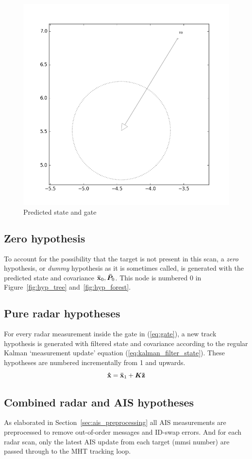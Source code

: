 \begin{figure}
\centering
\includegraphics[width = .7\textwidth]{Figures/gate_without_measurement.png}
\caption{Predicted state and gate}\label{fig:gate_illustration}
\end{figure}

\subsection{Zero hypothesis}
To account for the possibility that the target is not present in this scan, a \emph{zero} hypothesis, or \emph{dummy} hypothesis as it is sometimes called, is generated with the predicted state and covariance \(\boldsymbol{\mathbf{\bar{x}}}_0, \bm{\bar{P}}_0\). This node is numbered 0 in Figure~\ref{fig:hyp_tree} and~\ref{fig:hyp_forest}.

\subsection{Pure radar hypotheses}
For every radar measurement inside the gate in (\ref{eq:gate}), a new track hypothesis is generated with filtered state and covariance according to the regular Kalman `measurement update' equation (\ref{eq:kalman_filter_state}). These hypotheses are numbered incrementally from 1 and upwards.
\begin{equation}
\boldsymbol{\mathbf{\hat{x}}} = \boldsymbol{\mathbf{\bar{x}}}_1 + \bm{K} \boldsymbol{\mathbf{\tilde{z}}}
\label{eq:kalman_filter_state}
\end{equation}

\subsection{Combined radar and AIS hypotheses}\label{subsec:combined_radar_and_ais_hypotheses}
As elaborated in Section~\ref{sec:ais_preprocessing} all AIS measurements are preprocessed to remove out-of-order messages and ID-swap errors. And for each radar scan, only the latest AIS update from each target (\gls{mmsi} number) are passed through to the MHT tracking loop.

